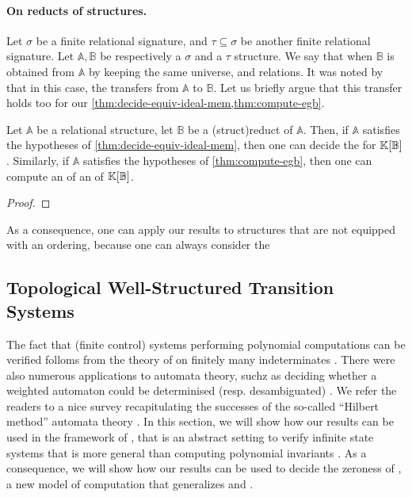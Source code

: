 \paragraph{On reducts of structures.} \AP Let $\sigma$ be a finite relational
signature, and $\tau \subseteq \sigma$ be another finite relational signature.
Let $\mathbb{A}, \mathbb{B}$ be respectively a $\sigma$ and a $\tau$ structure. We say
that  when $\mathbb{B}$ is
obtained from $\mathbb{A}$ by keeping the same universe, and relations. It was noted by \cite[Lemma 13]{GHOLAS24} that in
this case, the  transfers from
$\mathbb{A}$ to $\mathbb{B}$. Let us briefly argue that this transfer holds too
for our \cref{thm:decide-equiv-ideal-mem,thm:compute-egb}.

\begin{lemma}
  \label{lem:reducts-equiv-hilbert}
  Let $\mathbb{A}$ be a relational structure, let $\mathbb{B}$ be a 
  \kl(struct){reduct} of $\mathbb{A}$. Then, if $\mathbb{A}$ satisfies the
  hypotheses of \cref{thm:decide-equiv-ideal-mem},
  then one can decide the  for
  $\mathbb{K}[\mathbb{B}]$. Similarly, 
  if $\mathbb{A}$ satisfies the hypotheses of
  \cref{thm:compute-egb}, then one can compute an
   of an
   of $\mathbb{K}[\mathbb{B}]$.
\end{lemma}
\begin{proof}
\end{proof}

\AP 
As a consequence, one can apply our results to structures that are not equipped 
with an ordering, because one can always consider the 




\subsection{Topological Well-Structured Transition Systems}

The fact that (finite control) systems performing polynomial computations can
be verified folloms from the theory of  on finitely many
indeterminates \cite{MULSEI02,BEDUSHWO17}. There were also numerous
applications to automata theory, suchz as deciding whether a weighted automaton
could be determinised (resp. desambiguated) \cite{BESM23,PUSM24}. We refer the
readers to a nice survey recapitulating the successes of the so-called
``Hilbert method'' automata theory \cite{BOJAN19}. In this section, we will
show how our results can be used in the framework of , that is an abstract setting to verify
infinite state systems that is more general than computing polynomial
invariants \cite{JGL07,JGL10}. As a consequence, we will show how our results
can be used to decide the zeroness of , a
new model of computation that generalizes 
\cite{BEDUSHWO17} and  \cite{BOKLMO21}.

